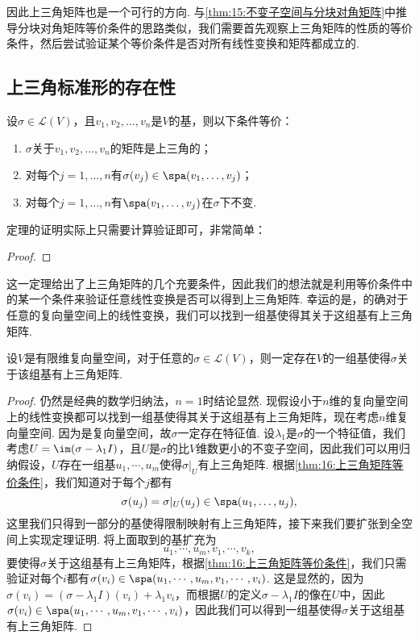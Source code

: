 因此上三角矩阵也是一个可行的方向. 与\autoref{thm:15:不变子空间与分块对角矩阵}中推导分块对角矩阵等价条件的思路类似，我们需要首先观察上三角矩阵的性质的等价条件，然后尝试验证某个等价条件是否对所有线性变换和矩阵都成立的.

\subsection{上三角标准形的存在性}

\begin{theorem} \label{thm:16:上三角矩阵等价条件}
    设$\sigma\in \mathcal{L}(V)$，且$v_1,v_2,\ldots,v_n$是$V$的基，则以下条件等价：
    \begin{enumerate}
        \item $\sigma$关于$v_1,v_2,\ldots,v_n$的矩阵是上三角的；

        \item 对每个$j=1,\ldots,n$有$\sigma(v_j)\in\spa(v_1,\ldots,v_j)$；

        \item 对每个$j=1,\ldots,n$有$\spa(v_1,\ldots,v_j)$在$\sigma$下不变.
    \end{enumerate}
\end{theorem}
定理的证明实际上只需要计算验证即可，非常简单：
\begin{proof}

\end{proof}

这一定理给出了上三角矩阵的几个充要条件，因此我们的想法就是利用等价条件中的某一个条件来验证任意线性变换是否可以得到上三角矩阵. 幸运的是，的确对于任意的复向量空间上的线性变换，我们可以找到一组基使得其关于这组基有上三角矩阵.
\begin{theorem}\label{thm:16:上三角矩阵存在}
    设$V$是有限维复向量空间，对于任意的$\sigma\in \mathcal{L}(V)$，则一定存在$V$的一组基使得$\sigma$关于该组基有上三角矩阵.
\end{theorem}
\begin{proof}
    仍然是经典的数学归纳法，$n=1$时结论显然. 现假设小于$n$维的复向量空间上的线性变换都可以找到一组基使得其关于这组基有上三角矩阵，现在考虑$n$维复向量空间. 因为是复向量空间，故$\sigma$一定存在特征值. 设$\lambda_1$是$\sigma$的一个特征值，我们考虑$U=\im(\sigma-\lambda_1 I)$，且$U$是$\sigma$的比$V$维数更小的不变子空间，因此我们可以用归纳假设，$U$存在一组基$u_1,\cdots,u_m$使得$\sigma\vert_U$有上三角矩阵. 根据\autoref{thm:16:上三角矩阵等价条件}，我们知道对于每个$j$都有
    \[\sigma(u_j)=\sigma\vert_U(u_j)\in\spa(u_1,\ldots,u_j),\]
    这里我们只得到一部分的基使得限制映射有上三角矩阵，接下来我们要扩张到全空间上实现定理证明. 将上面取到的基扩充为
    \[u_1,\cdots,u_m,v_1,\cdots,v_k,\]
    要使得$\sigma$关于这组基有上三角矩阵，根据\autoref{thm:16:上三角矩阵等价条件}，我们只需验证对每个$i$都有$\sigma(v_i)\in\spa(u_1,\cdots,u_m,v_1,\cdots,v_i)$. 这是显然的，因为$\sigma(v_i)=(\sigma-\lambda_1 I)(v_i)+\lambda_1 v_i$，而根据$U$的定义$\sigma-\lambda_1 I$的像在$U$中，因此$\sigma(v_i)\in\spa(u_1,\cdots,u_m,v_1,\cdots,v_i)$，因此我们可以得到一组基使得$\sigma$关于这组基有上三角矩阵.
\end{proof}


